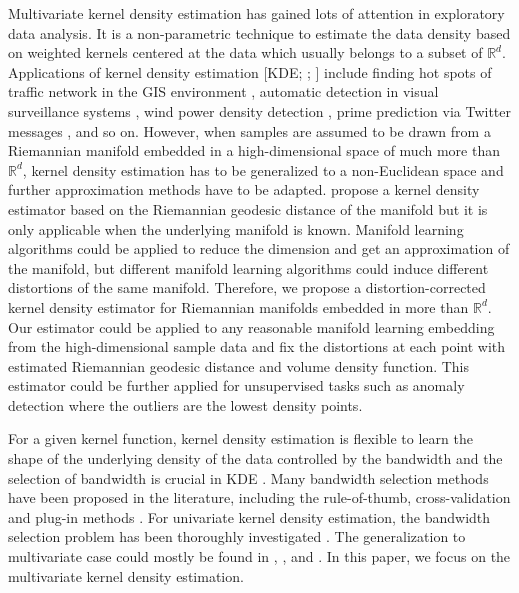 \documentclass[11pt,a4paper,]{article}
\begin{document}
Multivariate kernel density estimation has gained lots of attention in exploratory data analysis. It is a non-parametric technique to estimate the data density based on weighted kernels centered at the data which usually belongs to a subset of \(\mathbb{R}^d\). Applications of kernel density estimation {[}KDE; \textcite{Parzen1962-gt}; \textcite{Chen2017-dw}{]} include finding hot spots of traffic network in the GIS environment \autocite{Xie2008-eb,Okabe2009-nb}, automatic detection in visual surveillance systems \autocite{Elgammal2002-cw}, wind power density detection \autocite{Jeon2012-ac}, prime prediction via Twitter messages \autocite{Gerber2014-tq}, and so on. However, when samples are assumed to be drawn from a Riemannian manifold embedded in a high-dimensional space of much more than \(\mathbb{R}^d\), kernel density estimation has to be generalized to a non-Euclidean space and further approximation methods have to be adapted. \textcite{Pelletier2005-vu} propose a kernel density estimator based on the Riemannian geodesic distance of the manifold but it is only applicable when the underlying manifold is known. Manifold learning algorithms could be applied to reduce the dimension and get an approximation of the manifold, but different manifold learning algorithms could induce different distortions of the same manifold. Therefore, we propose a distortion-corrected kernel density estimator for Riemannian manifolds embedded in more than \(\mathbb{R}^d\). Our estimator could be applied to any reasonable manifold learning embedding from the high-dimensional sample data and fix the distortions at each point with estimated Riemannian geodesic distance and volume density function. This estimator could be further applied for unsupervised tasks such as anomaly detection where the outliers are the lowest density points.

For a given kernel function, kernel density estimation is flexible to learn the shape of the underlying density of the data controlled by the bandwidth and the selection of bandwidth is crucial in KDE \autocite{Jones1990-oe,Terrell1992-ut}.
Many bandwidth selection methods have been proposed in the literature, including the rule-of-thumb, cross-validation \autocite{Jones1992-ta,Sain1994-gr} and plug-in methods \autocites[See][]{Heidenreich2013-bl}[ for details]{Scott2015-vl}.
For univariate kernel density estimation, the bandwidth selection problem has been thoroughly investigated \autocites[See][]{Jones1992-ef,Cao1994-st,Jones1996-cb}[ for reviews]{Wand1994-xu}. The generalization to multivariate case could mostly be found in \textcite{Duong2003-sp}, \textcite{Duong2004-rh}, and \textcite{Chacon2010-wm}. In this paper, we focus on the multivariate kernel density estimation.
\end{document}
